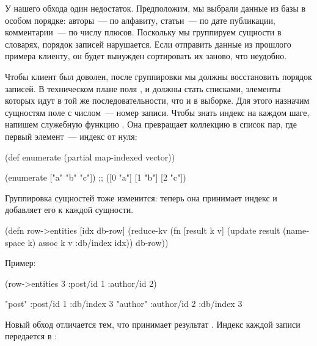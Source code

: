 У нашего обхода один недостаток. Предположим, мы выбрали данные из базы в особом порядке: авторы~--- по алфавиту, статьи~--- по дате публикации, комментарии~--- по числу плюсов. Поскольку мы группируем сущности в словарях, порядок записей нарушается. Если отправить данные из прошлого примера клиенту, он будет вынужден сортировать их заново, что неудобно.

Чтобы клиент был доволен, после группировки мы должны восстановить порядок записей. В техническом плане поля ,  и  должны стать списками, элементы которых идут в той же последовательности, что и в выборке. Для этого назначим сущностям поле  с числом~--- номер записи. Чтобы знать индекс на каждом шаге, напишем служебную функцию . Она превращает коллекцию в список пар, где первый элемент~--- индекс от нуля:

\begin{english}
  \begin{clojure}
(def enumerate
  (partial map-indexed vector))

(enumerate ["a" "b" "c"])
;; ([0 "a"] [1 "b"] [2 "c"])
  \end{clojure}
\end{english}

Группировка сущностей тоже изменится: теперь она принимает индекс и добавляет его к каждой сущности.

\begin{english}
  \begin{clojure}
(defn row->entities [idx db-row]
  (reduce-kv
   (fn [result k v]
     (update result
             (namespace k)
             assoc
             k v
             :db/index idx))
   {}
   db-row))
  \end{clojure}
\end{english}

Пример:

\begin{english}
  \begin{clojure}
(row->entities 3 {:post/id 1 :author/id 2})

{"post" {:post/id 1 :db/index 3}
 "author" {:author/id 2 :db/index 3}}
  \end{clojure}
\end{english}

Новый обход отличается тем, что  принимает результат . Индекс каждой записи передается в :

